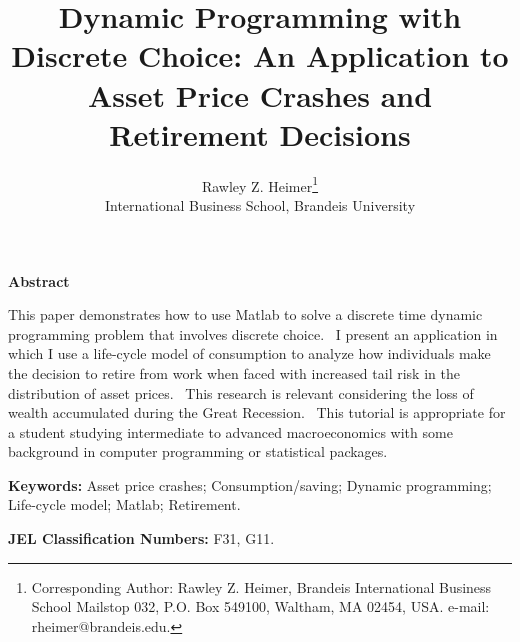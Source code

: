 \documentclass[12pt]{article}
\begin{document}
\title{Dynamic Programming with Discrete Choice: An Application to Asset
Price Crashes and Retirement Decisions}
\author{Rawley Z. Heimer\thanks{%
Corresponding Author: Rawley Z. Heimer, Brandeis International Business
School Mailstop 032, P.O. Box 549100, Waltham, MA 02454, USA. e-mail:
rheimer@brandeis.edu. } \\
{\normalsize International Business School, Brandeis University}}
\maketitle

\sloppy

\begin{center}
\textbf{Abstract}
\end{center}

\noindent%
This paper demonstrates how to use Matlab to solve a discrete time dynamic
programming problem that involves discrete choice. \ I present an
application in which I use a life-cycle model of consumption to analyze how
individuals make the decision to retire from work when faced with increased
tail risk in the distribution of asset prices. \ This research is relevant
considering the loss of wealth accumulated during the Great Recession. \
This tutorial is appropriate for a student studying intermediate to advanced
macroeconomics with some background in computer programming or statistical
packages. \ 

\strut 

\bigskip 

\bigskip 

\bigskip 

\bigskip 

\bigskip 

\bigskip 

\bigskip 

\bigskip 

\bigskip 

\bigskip 

\bigskip 

\bigskip 

\textbf{Keywords:} Asset price crashes; Consumption/saving; Dynamic
programming; Life-cycle model; Matlab; Retirement.

\strut

\textbf{JEL Classification Numbers:} F31, G11.

\pagebreak 
\onehalfspacing%
\end{document}
